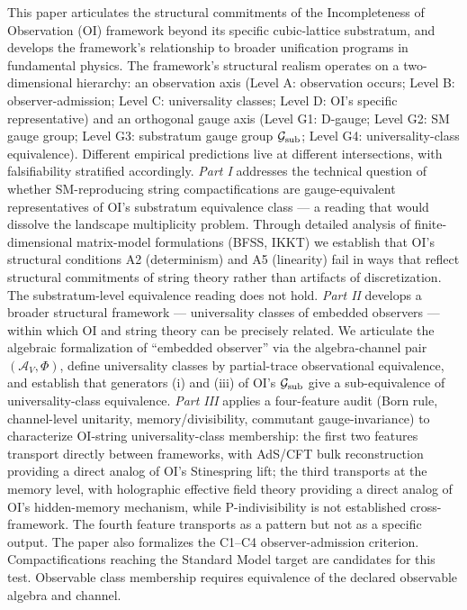 \documentclass[
]{article}
\begin{document}
This paper articulates the structural commitments of the Incompleteness
of Observation (OI) framework beyond its specific cubic-lattice
substratum, and develops the framework's relationship to broader
unification programs in fundamental physics. The framework's structural
realism operates on a two-dimensional hierarchy: an observation axis
(Level A: observation occurs; Level B: observer-admission; Level C:
universality classes; Level D: OI's specific representative) and an
orthogonal gauge axis (Level G1: D-gauge; Level G2: SM gauge group;
Level G3: substratum gauge group \(\mathcal{G}_{\rm sub}\); Level G4:
universality-class equivalence). Different empirical predictions live at
different intersections, with falsifiability stratified accordingly.
\emph{Part I} addresses the technical question of whether SM-reproducing
string compactifications are gauge-equivalent representatives of OI's
substratum equivalence class --- a reading that would dissolve the
landscape multiplicity problem. Through detailed analysis of
finite-dimensional matrix-model formulations (BFSS, IKKT) we establish
that OI's structural conditions A2 (determinism) and A5 (linearity) fail
in ways that reflect structural commitments of string theory rather than
artifacts of discretization. The substratum-level equivalence reading
does not hold. \emph{Part II} develops a broader structural framework
--- universality classes of embedded observers --- within which OI and
string theory can be precisely related. We articulate the algebraic
formalization of ``embedded observer'' via the algebra-channel pair
\((\mathcal{A}_V, \Phi)\), define universality classes by partial-trace
observational equivalence, and establish that generators (i) and (iii)
of OI's \(\mathcal{G}_{\rm sub}\) give a sub-equivalence of
universality-class equivalence. \emph{Part III} applies a four-feature
audit (Born rule, channel-level unitarity, memory/divisibility,
commutant gauge-invariance) to characterize OI-string universality-class
membership: the first two features transport directly between
frameworks, with AdS/CFT bulk reconstruction providing a direct analog
of OI's Stinespring lift; the third transports at the memory level, with
holographic effective field theory providing a direct analog of OI's
hidden-memory mechanism, while P-indivisibility is not established
cross-framework. The fourth feature transports as a pattern but not as a
specific output. The paper also formalizes the C1--C4 observer-admission
criterion. Compactifications reaching the Standard Model target are
candidates for this test. Observable class membership requires
equivalence of the declared observable algebra and channel.
\end{document}
